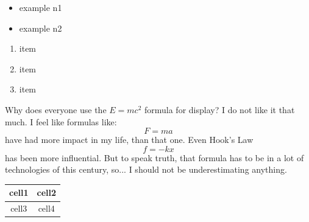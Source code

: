 \documentclass[12pt, es]{article}
\begin{document}
\begin{itemize}
    \item example n1
    \item example n2
\end{itemize}

\begin{enumerate}
    \item item
    \item item
    \item item
\end{enumerate}

Why does everyone use the \(E = m c^2\) formula for display? I do not like it that much.
I feel like formulas like:
\begin{equation}%
    F = ma    
\end{equation}
have had more impact in my life, than that one. Even Hook's Law \[f = -kx\] has been more influential. But to speak truth, that formula has to be in a lot of technologies of this century, so... I should not be underestimating anything.



\begin{center}%
\begin{tabular}{|c|c|}%
    \hline %
    cell1 & cell2 \\%
    \hline
    cell3 & cell4\\%
    \hline
\end{tabular}
\end{center}
\end{document}
